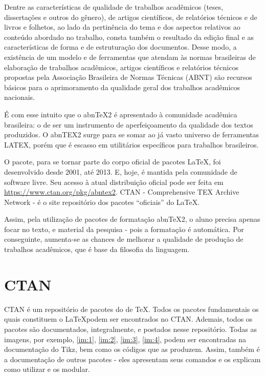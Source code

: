 \documentclass[
12pt,				%
openright,			%
oneside,			%
a4paper,			%
english,			%
french,				%
spanish,			%
brazil,				%
]{abntex2}
\begin{document}
\begin{citacao}
  Dentre as características de qualidade de trabalhos acadêmicos (teses, dissertações e
  outros do gênero), de artigos científicos, de relatórios técnicos e de livros e folhetos,
  ao lado da pertinência do tema e dos aspectos relativos ao conteúdo abordado no
  trabalho, consta também o resultado da edição final e as características de
  forma e de estruturação dos documentos. Desse modo, a existência de um modelo
  e de ferramentas que atendam às normas brasileiras de elaboração de trabalhos
  acadêmicos, artigos científicos e relatórios técnicos propostas pela Associação
  Brasileira de Normas Técnicas (ABNT) são recursos básicos para o aprimoramento
  da qualidade geral dos trabalhos acadêmicos nacionais.

  É com esse intuito que o abn\TeX2 é apresentado à comunidade acadêmica brasileira:
  o de ser um instrumento de aperfeiçoamento da qualidade dos textos produzidos.
  O abnTEX2 surge para se somar ao já vasto universo de ferramentas LATEX, porém
  que é escasso em utilitários específicos para trabalhos brasileiros. \cite[2.1]{araujoclasse}
\end{citacao}

O pacote, para se tornar parte do corpo oficial de pacotes \LaTeX, foi
desenvolvido desde 2001, até 2013. E, hoje, é mantida pela comunidade
de software livre. Seu acesso à atual distribuição oficial pode ser
feita em \url{https://www.ctan.org/pkg/abntex2}. CTAN - Comprehensive TEX Archive Network - é o site
repositório dos pacotes ``oficiais'' do \LaTeX.

Assim, pela utilização de pacotes de formatação abnTeX2, o aluno
precisa apenas focar no texto, e material da pesquisa - pois a
formatação é automática. Por conseguinte,
aumenta-se as chances de melhorar a qualidade de produção de trabalhos
acadêmicos, que é base da filosofia da linguagem.

\section{CTAN}

CTAN é um repositório de pacotes do de \TeX. Todos os pacotes
fundamentais os quais constituem o \LaTeX podem ser encontrados no
CTAN. Ademais, todos os pacotes são documentados, integralmente, e
postados nesse repositório. Todas as imagens, por exemplo, \autoref{im:1},
\autoref{im:2}, \autoref{im:3}, \autoref{im:4}, podem ser encontradas
na documentação do Tikz, bem como os códigos que as produzem. Assim,
também é a documentação de outros pacotes - eles apresentam seus
comandos e os explicam como utilizar e os modular.
\end{document}

